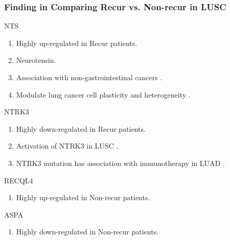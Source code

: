 \documentclass{beamer}
\begin{document}
    \begin{frame}[allowframebreaks]
        \frametitle{Finding in Comparing Recur vs. Non-recur in LUSC}

        \begin{block}{NTS}
            \begin{enumerate}
                \item Highly up-regulated in Recur patients.
                \item Neurotensin.
                \item Association with non-gastrointestinal cancers \cite{NTS1}.
                \item Modulate lung cancer cell plasticity and heterogeneity \cite{NTS2}.
            \end{enumerate}
        \end{block}

        \begin{block}{NTRK3}
            \begin{enumerate}
                \item Highly down-regulated in Recur patients.
                \item Activation of NTRK3 in LUSC \cite{NTRK3-1}.
                \item NTRK3 mutation has association with immunotherapy in LUAD \cite{NTRK3-2}.
            \end{enumerate}
        \end{block}

        \begin{block}{RECQL4}
            \begin{enumerate}
                \item Highly up-regulated in Non-recur patients.
            \end{enumerate}
        \end{block}

        \begin{block}{ASPA}
            \begin{enumerate}
                \item Highly down-regulated in Non-recur patients.
            \end{enumerate}
        \end{block}
    \end{frame}
\end{document}
